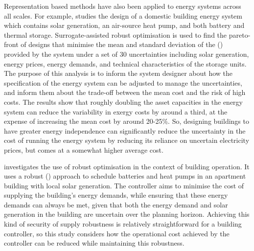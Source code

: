 Representation based methods have also been applied to energy systems across all scales.
For example,  studies the design of a domestic building energy system which contains solar generation, an air-source heat pump, and both battery and thermal storage. Surrogate-assisted robust optimisation is used to find the pareto-front of designs that minimise the mean and standard deviation of the  () provided by the system under a set of 30 uncertainties including solar generation, energy prices, energy demands, and technical characteristics of the storage units. The purpose of this analysis is to inform the system designer about how the specification of the energy system can be adjusted to manage the uncertainties, and inform them about the trade-off between the mean cost and the risk of high costs. The results show that roughly doubling the asset capacities in the energy system can reduce the variability in exergy costs by around a third, at the expense of increasing the mean cost by around 20-25\%. So, designing buildings to have greater energy independence can significantly reduce the uncertainty in the cost of running the energy system by reducing its reliance on uncertain electricity prices, but comes at a somewhat higher average cost.

 investigates the use of robust optimisation in the context of building operation. It uses a robust  () approach to schedule batteries and heat pumps in an apartment building with local solar generation. The controller aims to minimise the cost of supplying the building's energy demands, while ensuring that these energy demands can always be met, given that both the energy demand and solar generation in the building are uncertain over the planning horizon. Achieving this kind of security of supply robustness is relatively straightforward for a building controller, so this study considers how the operational cost achieved by the controller can be reduced while maintaining this robustness.

